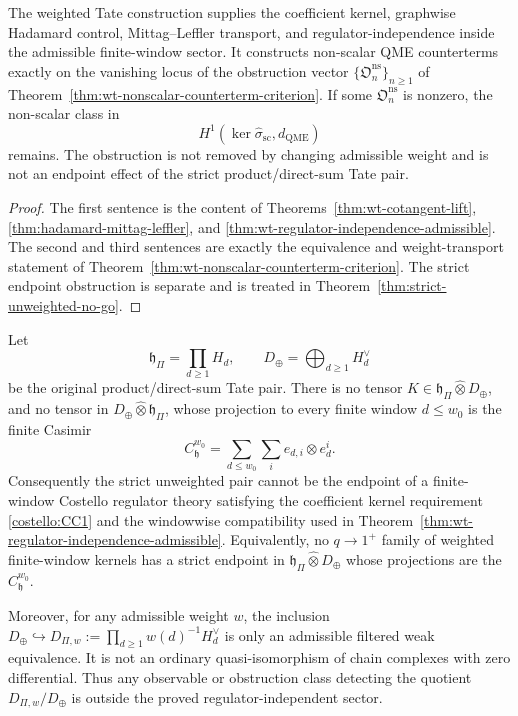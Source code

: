 \begin{cor}
\label{cor:wt-finite-window-nonscalar-boundary}
  The weighted Tate construction supplies the coefficient kernel,
  graphwise Hadamard control, Mittag--Leffler transport, and
  regulator-independence inside the admissible finite-window sector.  It
  constructs non-scalar QME counterterms exactly on the vanishing locus of
  the obstruction vector
  \(\{\mathfrak O^{\mathrm{ns}}_n\}_{n\geq1}\) of
  Theorem~\ref{thm:wt-nonscalar-counterterm-criterion}.  If some
  \(\mathfrak O^{\mathrm{ns}}_n\) is nonzero, the non-scalar class in
  \[
    H^1(\ker\widehat\sigma_{\mathrm{sc}},d_{\mathrm{QME}})
  \]
  remains.  The obstruction is not removed by changing admissible weight
  and is not an endpoint effect of the strict product/direct-sum Tate
  pair.
\end{cor}

\begin{proof}
  The first sentence is the content of
  Theorems~\ref{thm:wt-cotangent-lift},
  \ref{thm:hadamard-mittag-leffler}, and
  \ref{thm:wt-regulator-independence-admissible}.  The second and third
  sentences are exactly the equivalence and weight-transport statement of
  Theorem~\ref{thm:wt-nonscalar-counterterm-criterion}.  The strict
  endpoint obstruction is separate and is treated in
  Theorem~\ref{thm:strict-unweighted-no-go}.
\end{proof}

\begin{thm}
\label{thm:strict-unweighted-no-go}
  Let
  \[
    \mathfrak h_{\Pi}=\prod_{d\geq1}H_d,\qquad
    D_{\oplus}=\bigoplus_{d\geq1}H_d^\vee
  \]
  be the original product/direct-sum Tate pair.  There is no tensor
  \(K\in\mathfrak h_{\Pi}\widehat\otimes D_{\oplus}\), and no tensor
  in \(D_{\oplus}\widehat\otimes\mathfrak h_{\Pi}\), whose projection
  to every finite window \(d\leq w_0\) is the finite Casimir
  \[
    C^{w_0}_{\mathfrak h}=\sum_{d\leq w_0}\sum_i e_{d,i}\otimes e^i_d .
  \]
  Consequently the strict unweighted pair cannot be the endpoint of a
  finite-window Costello regulator theory satisfying the coefficient
  kernel requirement \ref{costello:CC1} and the windowwise compatibility
  used in Theorem~\ref{thm:wt-regulator-independence-admissible}.
  Equivalently, no \(q\to1^+\) family of weighted finite-window
  kernels has a strict endpoint in
  \(\mathfrak h_{\Pi}\widehat\otimes D_{\oplus}\) whose projections
  are the \(C^{w_0}_{\mathfrak h}\).

  Moreover, for any admissible weight \(w\), the inclusion
  \(D_{\oplus}\hookrightarrow
  D_{\Pi,w}:=\prod_{d\geq1}w(d)^{-1}H_d^\vee\) is only an admissible
  filtered weak equivalence.  It is not an ordinary quasi-isomorphism
  of chain complexes with zero differential.  Thus any observable or
  obstruction class detecting the quotient
  \(D_{\Pi,w}/D_{\oplus}\) is outside the proved regulator-independent
  sector.
\end{thm}

